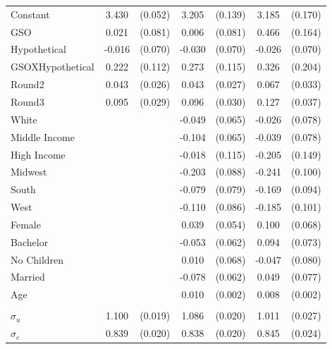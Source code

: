 \documentclass[12pt]{article}
\newcommand{\sym}[1]{\rlap{$^{#1}$}}
\begin{document}
\begin{table}[H]
{\begin{tabular}{l*{3}{cc}}
Constant    &       3.430\sym{***}&     (0.052)&       3.205\sym{***}&     (0.139)&       3.185\sym{***}&     (0.170)\\
GSO         &       0.021         &     (0.081)&       0.006         &     (0.081)&       0.466\sym{***}&     (0.164)\\
Hypothetical&      -0.016         &     (0.070)&      -0.030         &     (0.070)&      -0.026         &     (0.070)\\
GSOXHypothetical&       0.222\sym{**} &     (0.112)&       0.273\sym{**} &     (0.115)&       0.326         &     (0.204)\\
Round2      &       0.043         &     (0.026)&       0.043         &     (0.027)&       0.067\sym{**} &     (0.033)\\
Round3      &       0.095\sym{***}&     (0.029)&       0.096\sym{***}&     (0.030)&       0.127\sym{***}&     (0.037)\\
White       &                     &            &      -0.049         &     (0.065)&      -0.026         &     (0.078)\\
Middle Income&                     &            &      -0.104         &     (0.065)&      -0.039         &     (0.078)\\
High Income &                     &            &      -0.018         &     (0.115)&      -0.205         &     (0.149)\\
Midwest     &                     &            &      -0.203\sym{**} &     (0.088)&      -0.241\sym{**} &     (0.100)\\
South       &                     &            &      -0.079         &     (0.079)&      -0.169\sym{*}  &     (0.094)\\
West        &                     &            &      -0.110         &     (0.086)&      -0.185\sym{*}  &     (0.101)\\
Female      &                     &            &       0.039         &     (0.054)&       0.100         &     (0.068)\\
Bachelor    &                     &            &      -0.053         &     (0.062)&       0.094         &     (0.073)\\
No Children &                     &            &       0.010         &     (0.068)&      -0.047         &     (0.080)\\
Married     &                     &            &      -0.078         &     (0.062)&       0.049         &     (0.077)\\
Age         &                     &            &       0.010\sym{***}&     (0.002)&       0.008\sym{***}&     (0.002)\\
        \\
$\sigma_u $    &       1.100\sym{***}&     (0.019)&       1.086\sym{***}&     (0.020)&       1.011\sym{***}&     (0.027)\\
$\sigma_e$     &       0.839\sym{***}&     (0.020)&       0.838\sym{***}&     (0.020)&       0.845\sym{***}&     (0.024)\\



\end{tabular}}
\end{table}
\end{document}

